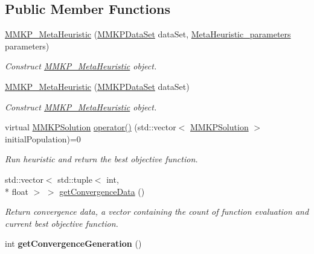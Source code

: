 \subsection*{Public Member Functions}
\begin{DoxyCompactItemize}
\item 
\hyperlink{class_m_m_k_p___meta_heuristic_ad4e9b2d9eb8a3c4c463af4dc1be94147}{M\+M\+K\+P\+\_\+\+Meta\+Heuristic} (\hyperlink{class_m_m_k_p_data_set}{M\+M\+K\+P\+Data\+Set} data\+Set, \hyperlink{class_meta_heuristic__parameters}{Meta\+Heuristic\+\_\+parameters} parameters)
\begin{DoxyCompactList}\small\item\em Construct \hyperlink{class_m_m_k_p___meta_heuristic}{M\+M\+K\+P\+\_\+\+Meta\+Heuristic} object. \end{DoxyCompactList}\item 
\hyperlink{class_m_m_k_p___meta_heuristic_a95161dd44bc787c290bdcf58013c3775}{M\+M\+K\+P\+\_\+\+Meta\+Heuristic} (\hyperlink{class_m_m_k_p_data_set}{M\+M\+K\+P\+Data\+Set} data\+Set)
\begin{DoxyCompactList}\small\item\em Construct \hyperlink{class_m_m_k_p___meta_heuristic}{M\+M\+K\+P\+\_\+\+Meta\+Heuristic} object. \end{DoxyCompactList}\item 
virtual \hyperlink{class_m_m_k_p_solution}{M\+M\+K\+P\+Solution} \hyperlink{class_m_m_k_p___meta_heuristic_acc3de42187c16d4a31776e18135035e5}{operator()} (std\+::vector$<$ \hyperlink{class_m_m_k_p_solution}{M\+M\+K\+P\+Solution} $>$ initial\+Population)=0
\begin{DoxyCompactList}\small\item\em Run heuristic and return the best objective function. \end{DoxyCompactList}\item 
std\+::vector$<$ std\+::tuple$<$ int, \\*
float $>$ $>$ \hyperlink{class_m_m_k_p___meta_heuristic_a1aeedbaaa0239ee995aa81242a1d493d}{get\+Convergence\+Data} ()
\begin{DoxyCompactList}\small\item\em Return convergence data, a vector containing the count of function evaluation and current best objective function. \end{DoxyCompactList}\item 
\hypertarget{class_m_m_k_p___meta_heuristic_a540b77809427e58bf2be756d1b73aa63}{int {\bfseries get\+Convergence\+Generation} ()}\label{class_m_m_k_p___meta_heuristic_a540b77809427e58bf2be756d1b73aa63}


\end{DoxyCompactItemize}
